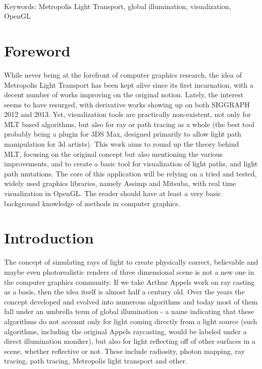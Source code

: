 \documentclass[a4paper,12pt,oneside,final]{memoir}
\begin{document}
~\\
Keywords: Metropolis Light Transport, global illumination, visualization, OpenGL
\vfill\eject 

\chapter*{Foreword}\label{chap:foreword}
While never being at the forefront of computer graphics research, the idea of Metropolis Light Transport has been kept alive since its first incarnation, with a decent number of works improving on the original notion. Lately, the interest seems to have resurged, with derivative works showing up on both SIGGRAPH 2012 and 2013. Yet, visualization tools are practically non-existent, not only for MLT based algorithms, but also for ray or path tracing as a whole (the best tool probably being a plugin for 3DS Max, designed primarily to allow light path manipulation for 3d artists). This work aims to round up the theory behind MLT, focusing on the original concept but also mentioning the various improvements, and to create a basic tool for visualization of light paths, and light path mutations. The core of this application will be relying on a tried and tested, widely used graphics libraries, namely Assimp and Mitsuba, with real time visualization in OpenGL. The reader should have at least a very basic background knowledge of methods in computer graphics. 
\vfill\eject 
\begin{KeepFromToc}
	\tableofcontents
	\newpage
	\listoffigures
\end{KeepFromToc}


\mainmatter

\chapter*{Introduction}\label{chap:introduction}
The concept of simulating rays of light to create physically correct, believable and maybe even photorealistic renders of three dimensional scene is not a new one in the computer graphics community. If we take Arthur Appels work on ray casting as a basis, then the idea itself is almost half a century old. Over the years the concept developed and evolved into numerous algorithms and today most of them fall under an umbrella term of global illumination - a name indicating that these algorithms do not account only for light coming directly from a light source (such algorithms, including the original Appels raycasting, would be labeled under a direct illumination moniker), but also for light reflecting off of other surfaces in a scene, whether reflective or not. These include radiosity, photon mapping, ray tracing, path tracing, Metropolis light transport and other.
\end{document}
